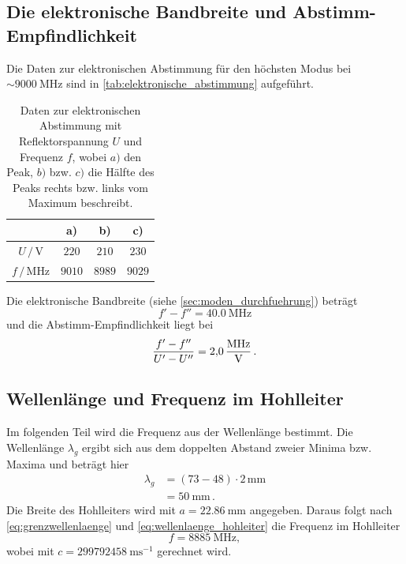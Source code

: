 \subsection{Die elektronische Bandbreite und Abstimm-Empfindlichkeit}
Die Daten zur elektronischen Abstimmung für den höchsten Modus bei $\sim \SI{9000}{\mega\hertz}$ sind in \autoref{tab:elektronische_abstimmung} aufgeführt.
\begin{table}
    \centering
    \caption{Daten zur elektronischen Abstimmung mit Reflektorspannung $U$ und Frequenz $f$, wobei $a)$ den Peak, $b)$ bzw. $c)$ die Hälfte des Peaks rechts bzw. links vom Maximum beschreibt.}
    \begin{tabular}{c c c c}
        \toprule
        & a) & b) & c) \\
        \midrule
        $U \,/\, \si{\volt}$ & $220$ & $210$ & $230$ \\
        $f \,/\, \si{\mega\hertz}$ & $9010$ & $8989$ & $9029$ \\
    \end{tabular}
    \label{tab:elektronische_abstimmung}
\end{table}
Die elektronische Bandbreite (siehe \autoref{sec:moden_durchfuehrung}) beträgt
\begin{equation*}
    f' - f'' = \SI{40.0}{\mega\hertz}
\end{equation*}
und die Abstimm-Empfindlichkeit liegt bei
\begin{equation*}
    \frac{f' - f''}{U' - U''} = \SI{2.0}{\frac{\mega\hertz}{\volt}} \, .
\end{equation*}
\FloatBarrier

\subsection{Wellenlänge und Frequenz im Hohlleiter}
\label{sec:ausw_frequenz}
Im folgenden Teil wird die Frequenz aus der Wellenlänge bestimmt.
Die Wellenlänge $\lambda_g$ ergibt sich aus dem doppelten Abstand zweier Minima bzw. Maxima und beträgt hier
\begin{align*}
    \lambda_g &= (73 - 48) \cdot 2 \, \si{\milli \metre} \\
    &= \SI{50}{\milli \metre} \, .
\end{align*}
Die Breite des Hohlleiters wird mit $a = \SI{22.86}{\milli \metre}$ angegeben.
Daraus folgt nach \autoref{eq:grenzwellenlaenge} und \autoref{eq:wellenlaenge_hohleiter} die Frequenz im Hohlleiter
\begin{equation*}
    f = \SI{8885}{\mega\hertz},
\end{equation*}
wobei mit $c = \SI{299792458}{\meter\second^{-1}}$ gerechnet wird.
\FloatBarrier

